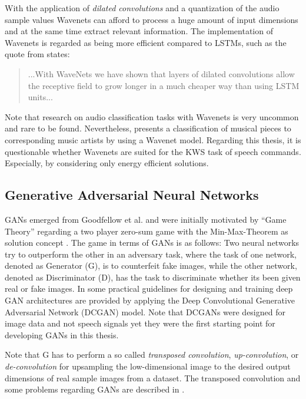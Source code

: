 With the application of \emph{dilated convolutions} and a quantization of the audio sample values Wavenets can afford to process a huge amount of input dimensions and at the same time extract relevant information.
The implementation of Wavenets is regarded as being more efficient compared to LSTMs, such as the quote from \cite{Oord2016} states:
\begin{quote}
  ...With WaveNets we have shown that layers of dilated convolutions allow the receptive field to grow longer in a much cheaper way than using LSTM units...
\end{quote}
Note that research on audio classification tasks with Wavenets is very uncommon and rare to be found.
Nevertheless, \cite{Zhang2020} presents a classification of musical pieces to corresponding music artists by using a Wavenet model.
Regarding this thesis, it is questionable whether Wavenets are suited for the KWS task of speech commands.
Especially, by considering only energy efficient solutions.



\subsection{Generative Adversarial Neural Networks}\label{sec:prev_nn_adv}
GANs \cite{Goodfellow2014} emerged from Goodfellow et al. and were initially motivated by \enquote{Game Theory} regarding a two player zero-sum game with the Min-Max-Theorem as solution concept \cite{VonNeumann1944}.
The game in terms of GANs is as follows: Two neural networks try to outperform the other in an adversary task, where the task of one network, denoted as Generator (G), is to counterfeit fake images, while the other network, denoted as Discriminator (D), has the task to discriminate whether its been given real or fake images.
In \cite{Radford2016} some practical guidelines for designing and training deep GAN architectures are provided by applying the Deep Convolutional Generative Adversarial Network (DCGAN) model.
Note that DCGANs were designed for image data and not speech signals yet they were the first starting point for developing GANs in this thesis.

Note that G has to perform a so called \emph{transposed convolution}, \emph{up-convolution}, or \emph{de-convolution} for upsampling the low-dimensional image to the desired output dimensions of real sample images from a dataset.
The transposed convolution and some problems regarding GANs are described in \cite{Durall2020}.


